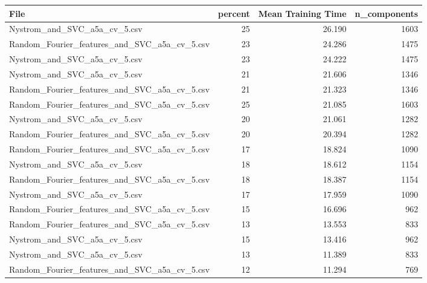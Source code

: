 \begin{tabularx}{\textwidth}{lrrr}
\toprule
                                        File &  percent &  Mean Training Time &  n\_components \\
\midrule
                Nystrom\_and\_SVC\_a5a\_cv\_5.csv &       25 &              26.190 &          1603 \\
Random\_Fourier\_features\_and\_SVC\_a5a\_cv\_5.csv &       23 &              24.286 &          1475 \\
                Nystrom\_and\_SVC\_a5a\_cv\_5.csv &       23 &              24.222 &          1475 \\
                Nystrom\_and\_SVC\_a5a\_cv\_5.csv &       21 &              21.606 &          1346 \\
Random\_Fourier\_features\_and\_SVC\_a5a\_cv\_5.csv &       21 &              21.323 &          1346 \\
Random\_Fourier\_features\_and\_SVC\_a5a\_cv\_5.csv &       25 &              21.085 &          1603 \\
                Nystrom\_and\_SVC\_a5a\_cv\_5.csv &       20 &              21.061 &          1282 \\
Random\_Fourier\_features\_and\_SVC\_a5a\_cv\_5.csv &       20 &              20.394 &          1282 \\
Random\_Fourier\_features\_and\_SVC\_a5a\_cv\_5.csv &       17 &              18.824 &          1090 \\
                Nystrom\_and\_SVC\_a5a\_cv\_5.csv &       18 &              18.612 &          1154 \\
Random\_Fourier\_features\_and\_SVC\_a5a\_cv\_5.csv &       18 &              18.387 &          1154 \\
                Nystrom\_and\_SVC\_a5a\_cv\_5.csv &       17 &              17.959 &          1090 \\
Random\_Fourier\_features\_and\_SVC\_a5a\_cv\_5.csv &       15 &              16.696 &           962 \\
Random\_Fourier\_features\_and\_SVC\_a5a\_cv\_5.csv &       13 &              13.553 &           833 \\
                Nystrom\_and\_SVC\_a5a\_cv\_5.csv &       15 &              13.416 &           962 \\
                Nystrom\_and\_SVC\_a5a\_cv\_5.csv &       13 &              11.389 &           833 \\
Random\_Fourier\_features\_and\_SVC\_a5a\_cv\_5.csv &       12 &              11.294 &           769 \\

\end{tabularx}
